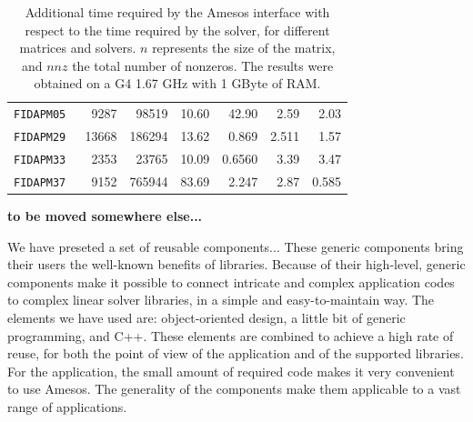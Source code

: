 \documentclass[acmtocl]{acmtrans2m}
\begin{document}
\begin{table}
\begin{center}
\begin{tabular}{|l r r r| r r r|}
\tt FIDAPM05 & 9287  & 98519  & 10.60 & 42.90  & 2.59  & 2.03  \\
\tt FIDAPM29 & 13668 & 186294 & 13.62 & 0.869  & 2.511 & 1.57  \\
\tt FIDAPM33 & 2353  & 23765  & 10.09 & 0.6560 & 3.39  & 3.47  \\
\tt FIDAPM37 & 9152  & 765944 & 83.69 & 2.247  & 2.87  & 0.585 \\
\hline
\end{tabular}
\caption{Additional time required by the Amesos interface with respect to the
time required by the solver, for different matrices and solvers. $n$
  represents the size of the matrix, and $nnz$ the total number of nonzeros.
The results were obtained on a G4 1.67 GHz with 1 GByte of RAM.}
\label{tab:interface}
\end{center}
\end{table}

{\bf to be moved somewhere else...}

We have preseted a set of reusable components... These generic components bring their
users the well-known benefits of libraries. Because of their high-level,
      generic components make it possible to connect intricate and complex
      application codes to complex linear solver libraries, in a simple and
      easy-to-maintain way. The elements we have used are: object-oriented
      design, a little bit of  generic programming, and C++. These elements
      are combined to achieve a high rate of reuse, for both the point of view
      of the application and of the supported libraries. For the application,
      the small amount of required code makes it very convenient to use
      Amesos. The generality of the components make them applicable to a vast
      range of applications.
      



\end{document}
